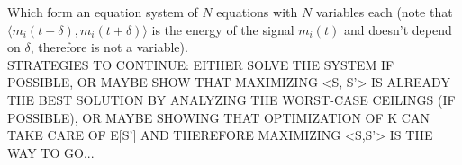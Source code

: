 \documentclass[11pt]{scrartcl} %
\begin{document}
  Which form an equation system of \(N\) equations with \(N\) variables each (note that \(\langle m_i{\scriptstyle (t+\delta)}, m_i{\scriptstyle (t+\delta)}\rangle \) is the energy of the signal \(m_i{\scriptstyle (t)}\) and doesn't depend on \(\delta\), therefore is not a variable).\\
  STRATEGIES TO CONTINUE: EITHER SOLVE THE SYSTEM IF POSSIBLE, OR MAYBE SHOW THAT MAXIMIZING <S, S'> IS ALREADY THE BEST SOLUTION BY ANALYZING THE WORST-CASE CEILINGS (IF POSSIBLE), OR MAYBE SHOWING THAT OPTIMIZATION OF K CAN TAKE CARE OF E[S'] AND THEREFORE MAXIMIZING <S,S'> IS THE WAY TO GO...



\end{document}
